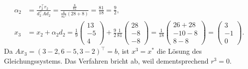 \documentclass[english, parskip=full]{scrartcl}
\begin{document}
\begin{align}
\alpha_2 &= \frac{r_2^\top r_2}{d_2^\top Ad_2} = \frac{\frac{8}{81}}{\frac{4}{81^2}(28 + 8)} = \frac{81}{18} = \frac{9}{2},\\
x_3 &= x_2 + \alpha_2d_2 = \frac{1}{9}\begin{pmatrix}
13 \\ -5 \\ 4
\end{pmatrix} + \frac{9}{2} \frac{1}{81} \begin{pmatrix}
28 \\ -8 \\ -8
\end{pmatrix} = \frac{1}{18}\begin{pmatrix}
26 + 28 \\ -10 - 8 \\ 8 - 8
\end{pmatrix} = \begin{pmatrix}
3 \\ -1 \\ 0
\end{pmatrix}.
\end{align}
Da $Ax_3 = (3-2, 6-5, 3-2)^\top = b$, ist $x^3=x^\ast$ die Lösung des Gleichungssystems. 
Das Verfahren bricht ab, weil dementsprechend $r^3 = 0$.

%

\end{document}
